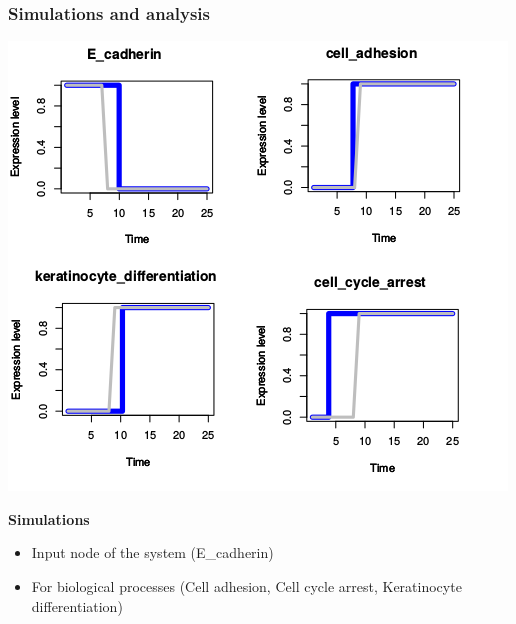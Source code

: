 \begin{frame}[c]
  \frametitle{Simulations and analysis}
  
 \begin{center}
  \includegraphics[scale=0.35]{figs/key_nodes1.png}
\end{center}

\textbf{Simulations}

\begin{itemize}
  \item Input node of the system (E\_cadherin)
 \item For biological processes (Cell adhesion, Cell cycle arrest, Keratinocyte differentiation)
  
\end{itemize}


\end{frame}


